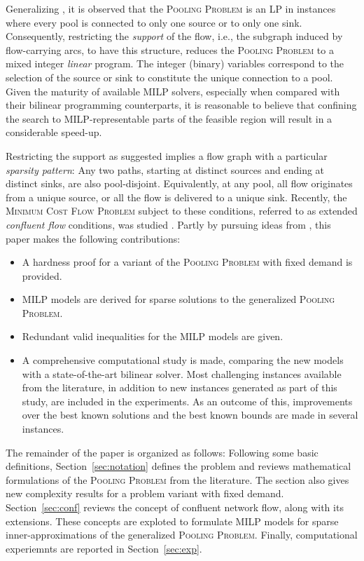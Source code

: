 \documentclass[pdflatex,sn-mathphys-num]{sn-jnl}%
\theoremstyle{thmstyleone}%
\begin{document}
Generalizing \cite[Proposition 3]{haugland16a}, it is observed that the \textsc{Pooling Problem} is an LP in instances where
every pool is connected to only one source or to only one sink.
Consequently, restricting the \emph{support} of the flow, i.e., the subgraph induced by flow-carrying arcs, to have this structure,
reduces the \textsc{Pooling Problem} to a mixed integer \emph{linear} program.
The integer (binary) variables correspond to the selection of the source or sink to constitute the unique connection to a pool.
Given the maturity of available MILP solvers, especially when compared with their bilinear programming counterparts,
it is reasonable to believe that confining the search to MILP-representable parts of the feasible region will result in a considerable speed-up.

Restricting the support as suggested implies a flow graph with a particular \emph{sparsity pattern}:
Any two paths, starting at distinct sources and ending at distinct sinks, are also pool-disjoint.
Equivalently, at any pool, all flow originates from a unique source, or all the flow is delivered to a unique sink.
Recently, the \textsc{Minimum Cost Flow Problem} subject to these conditions, referred to as extended \emph{confluent flow} conditions,
was studied \cite{haugland26}.
Partly by pursuing ideas from \cite{haugland26}, this paper makes the following contributions:
\begin{itemize}
\item A hardness proof for a variant of the \textsc{Pooling Problem} with fixed demand \cite{ruiz13,grothey23} is provided.
\item MILP models are derived for sparse solutions to the generalized \textsc{Pooling Problem}.
\item Redundant valid inequalities for the MILP models are given.
\item A comprehensive computational study is made, comparing the new models with a state-of-the-art bilinear solver.
Most challenging instances available from the literature, in addition to new instances generated as part of this study,
are included in the experiments.
As an outcome of this, improvements over the best known solutions and the best known bounds are made in several instances.
\end{itemize}

The remainder of the paper is organized as follows:
Following some basic definitions, Section~\ref{sec:notation} defines the problem and reviews mathematical formulations of the
\textsc{Pooling Problem} from the literature.
The section also gives new complexity results for a problem variant with fixed demand.
Section~\ref{sec:conf} reviews the concept of confluent network flow, along with its extensions.
These concepts are exploted to formulate MILP models for sparse inner-approximations of the generalized \textsc{Pooling Problem}.
Finally, computational experiemnts are reported in Section~\ref{sec:exp}.
\end{document}
